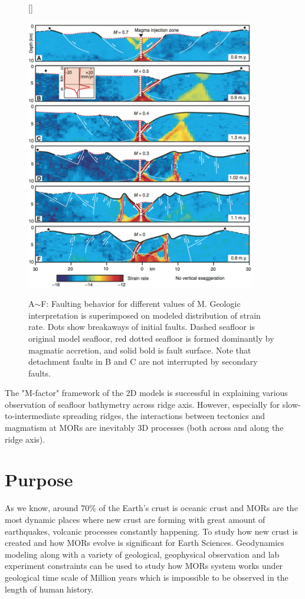 \documentclass[12pt]{article}
\begin{document}
\begin{figure}[H]
[\FBwidth]
{\caption{\small A$\sim$F: Faulting behavior for different values of M. Geologic interpretation is superimposed on modeled distribution of strain rate. Dots show breakaways of initial faults. Dashed seafloor is original model seafloor, red dotted seafloor is formed dominantly by magmatic accretion, and solid bold is fault surface. Note that detachment faults in B and C are not interrupted by secondary faults. \citep{Tucholke2008}}}
 {\includegraphics[width=10cm]{fig6_1.png}} 
 \label{fig6_1}
\end{figure}
The "M-factor" framework of the 2D models is successful in explaining various observation of seafloor bathymetry across ridge axis. However, especially for slow-to-intermediate spreading ridges, the interactions between tectonics and magmatism at MORs are inevitably 3D processes (both across and along the ridge axis).

\break
\section{Purpose}
\label{ch:purpose}
As we know, around 70\% of the Earth's crust is oceanic crust and MORs are the most dynamic places where new crust are forming with great amount of earthquakes, volcanic processes constantly happening. To study how new crust is created and how MORs evolve is significant for Earth Sciences. Geodynamics modeling along with a variety of geological, geophysical observation and lab experiment constraints can be used to study how MORs system works under geological time scale of Million years which is impossible to be observed in the length of human history.
\end{document}
